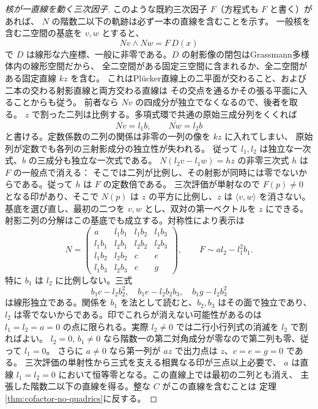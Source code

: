 \begin{proof}[核が一直線を動く三次因子]
このような既約三次因子 $F$（方程式も $F$ と書く）があれば、
$N$ の階数二以下の軌跡は必ず一本の直線を含むことを示す。
一般核を含む二空間の基底を $v,w$ とすると、
\[
             Nv\wedge Nw=F\,D(x)
\]
で $D$ は線形な六座標、一般に非零である。$D$ の射影像の閉包はGrassmann多様体内の線形空間だから、
全二空間がある固定三空間に含まれるか、全二空間がある固定直線 $kz$ を含む。
これはPlücker直線上の二平面が交わること、および二本の交わる射影直線と両方交わる直線は
その交点を通るかその張る平面に入ることからも従う。
前者なら $Nv$ の四成分が独立でなくなるので、後者を取る。
$z$ で割った二列は比例する。多項式環で共通の原始三成分列をくくれば
\[
             \overline{Nv}=l_1 b,\qquad \overline{Nw}=l_2 b
\]
と書ける。定数係数の二列の関係は非零の一列の像を $kz$ に入れてしまい、
原始列が定数でも各列の三射影成分の独立性が失われる。
従って $l_1,l_2$ は独立な一次式、$b$ の三成分も独立な一次式である。
$N(l_2v-l_1w)=h z$ の非零三次式 $h$ は $F$ の一般点で消える：
そこでは二列が比例し、その射影が同時には零でないからである。従って $h$ は $F$ の定数倍である。
三次評価が単射なので $F(p)\ne0$ となる印があり、そこで
$N(p)$ は $z$ の平方に比例し、$z$ は $\langle v,w\rangle$ を消さない。
基底を選び直し、最初の二つを $v,w$ とし、双対の第一ベクトルを $z$ にできる。
射影二列の分解はこの基底でも成立する。対称性により表示は
\[
 N=\begin{pmatrix}
 a & l_1b_1 & l_1b_2 & l_1b_3\\
 l_1b_1 & l_2b_1 & l_2b_2 & l_2b_3\\
 l_1b_2 & l_2b_2 & c & e\\
 l_1b_3 & l_2b_3 & e & g
 \end{pmatrix},\qquad
             F\sim a l_2-l_1^2 b_1 .
\]
特に $b_1$ は $l_2$ に比例しない。三式
\[
         b_1c-l_2b_2^2,\quad b_1e-l_2b_2b_3,\quad b_1g-l_2b_3^2
\]
は線形独立である。関係を $b_1$ を法として読むと、$b_2,b_3$ はその面で独立であり、
$l_2$ は零でないからである。印でこれらが消えない可能性があるのは
$l_1=l_2=a=0$ の点に限られる。実際 $l_2\ne0$ では二行小行列式の消滅を $l_2$ で割ればよい。
$l_2=0$, $b_1\ne0$ なら階数一の第二対角成分が零なので第二列も零、従って $l_1=0$。
さらに $a\ne0$ なら第一列が $az$ で出力点は $z$、$c=e=g=0$ である。
三次評価の単射性から三式を支える相異なる印が三点以上必要で、
$a$ は直線 $l_1=l_2=0$ において恒等零となる。この直線上では最初の二列とも消え、
主張した階数二以下の直線を得る。整な $C$ がこの直線を含むことは
定理\ref{thm:cofactor-no-quadrics}に反する。
\end{proof}
